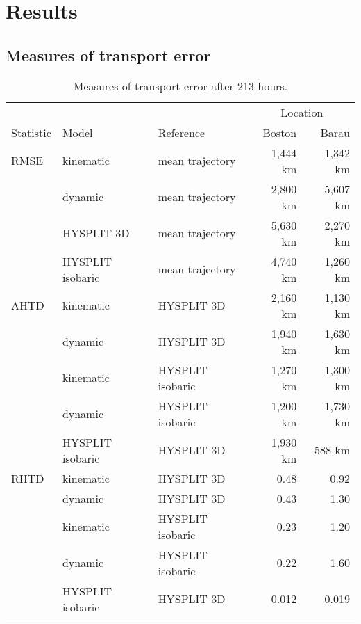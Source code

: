 \chapter{Results}

\section{Measures of transport error}

\begin{table}
    \centering
    \caption{Measures of transport error after 213 hours.}    
    \begin{tabular}{ l l l r r }
        \hline
        \hline
        			&				&				& 	\multicolumn{2}{c}{Location} \\
	\cline{4-5}
        Statistic 	& Model 			& Reference 		& Boston 		& Barau		\\
        \hline
        RMSE	& kinematic 		& mean trajectory	& 1,444 km	& 1,342 km	\\
        		 	& dynamic 		& mean trajectory	& 2,800 km	& 5,607 km	\\
			& HYSPLIT 3D 		& mean trajectory	& 5,630 km	& 2,270 km	\\
        		 	& HYSPLIT isobaric 	& mean trajectory	& 4,740 km	& 1,260 km	\\
        AHTD 	& kinematic		& HYSPLIT 3D		& 2,160 km	& 1,130 km	\\
        		 	& dynamic			& HYSPLIT 3D 		& 1,940 km	& 1,630 km	\\
        		 	& kinematic		& HYSPLIT isobaric  & 1,270 km	& 1,300 km	\\
        		 	& dynamic			& HYSPLIT isobaric  & 1,200 km	& 1,730 km	\\
			& HYSPLIT isobaric	& HYSPLIT 3D 		& 1,930 km	& 588 km		\\
        RHTD 	& kinematic		& HYSPLIT 3D		& 0.48		& 0.92		\\
        		 	& dynamic			& HYSPLIT 3D 		& 0.43		& 1.30		\\
        		 	& kinematic		& HYSPLIT isobaric  & 0.23		& 1.20		\\
        		 	& dynamic			& HYSPLIT isobaric  & 0.22		& 1.60		\\
			& HYSPLIT isobaric	& HYSPLIT 3D 		& 0.012		& 0.019		\\	
        \hline
    \end{tabular}
\end{table}